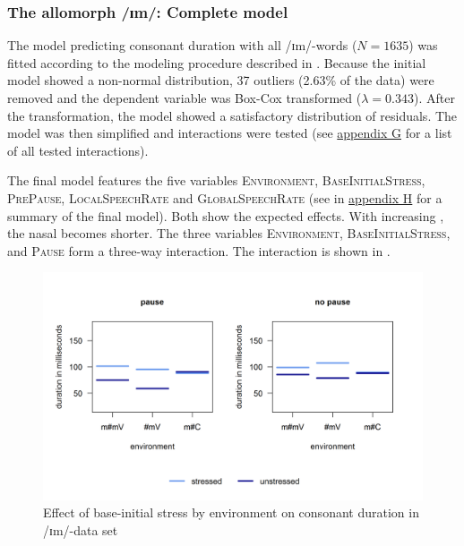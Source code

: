 \subsubsection{The allomorph /ɪm/: Complete model}

The model predicting consonant duration with all /ɪm/-words ($N=1635$) was fitted according to the modeling procedure described in .  Because the initial model showed a non-normal distribution,  37 outliers (2.63\% of the data) were removed and the dependent variable was Box-Cox transformed ($\lambda = 0.343$). 
After the transformation, the model showed a satisfactory distribution of residuals. The model was then simplified and interactions were tested (see \hyperref[Appendix G Summaries of tested interactions in experimental study]{appendix G} for a list of all tested interactions). 

 
The final model features the five variables \textsc{Environment}, \textsc{BaseInitialStress}, \textsc{PrePause}, \textsc{LocalSpeechRate} and \textsc{GlobalSpeechRate} (see  in \hyperref[Appendix H: Model Summaries Experiment]{appendix H} for a summary of the final model). Both  show the expected effects. With increasing , the nasal becomes shorter. The three variables \textsc{Environment}, \textsc{BaseInitialStress}, and \textsc{Pause} form a three-way interaction. The interaction is shown in .

\begin{figure}
	
	\includegraphics [scale=0.6] {images/Experiment/imModelCompleteInterEnvStressPause}
	
	\caption{Effect of base-initial stress by environment on consonant duration in /ɪm/-data set}
	\label{fig:NumNasal imCompleteexperiment}
\end{figure}


